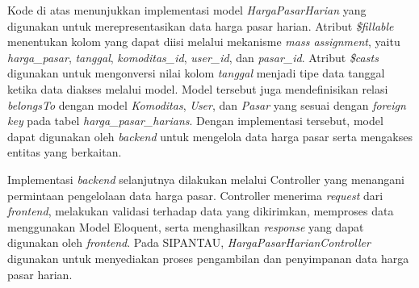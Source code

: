 \begin{code}
\end{code}

Kode di atas menunjukkan implementasi model \textit{HargaPasarHarian} yang digunakan untuk merepresentasikan data harga pasar harian. Atribut \textit{\$fillable} menentukan kolom yang dapat diisi melalui mekanisme \textit{mass assignment}, yaitu \textit{harga\allowbreak\_pasar}, \textit{tanggal}, \textit{komoditas\allowbreak\_id}, \textit{user\allowbreak\_id}, dan \textit{pasar\allowbreak\_id}. Atribut \textit{\$casts} digunakan untuk mengonversi nilai kolom \textit{tanggal} menjadi tipe data tanggal ketika data diakses melalui model. Model tersebut juga mendefinisikan relasi \textit{belongsTo} dengan model \textit{Komoditas}, \textit{User}, dan \textit{Pasar} yang sesuai dengan \textit{foreign key} pada tabel \textit{harga\allowbreak\_pasar\allowbreak\_harians}. Dengan implementasi tersebut, model dapat digunakan oleh \textit{backend} untuk mengelola data harga pasar serta mengakses entitas yang berkaitan.

Implementasi \textit{backend} selanjutnya dilakukan melalui Controller yang menangani permintaan pengelolaan data harga pasar. Controller menerima \textit{request} dari \textit{frontend}, melakukan validasi terhadap data yang dikirimkan, memproses data menggunakan Model Eloquent, serta menghasilkan \textit{response} yang dapat digunakan oleh \textit{frontend}. Pada SIPANTAU, \textit{HargaPasarHarianController} digunakan untuk menyediakan proses pengambilan dan penyimpanan data harga pasar harian.

